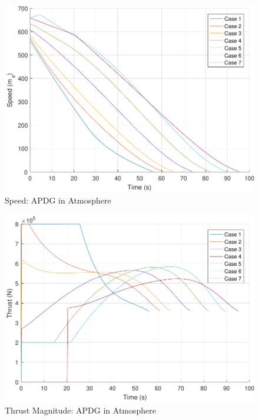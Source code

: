 \begin{figure}[H]
	\centering
	\begin{minipage}{4.5 in}
		\includegraphics[width=\linewidth]{Figures/spdpowatmo.pdf}
		\caption{Speed: APDG in Atmosphere \label{fig:spdpowatmo} }
	\end{minipage}
\end{figure}

\begin{figure}[H]
	\centering
	\begin{minipage}{4.5 in}
		\includegraphics[width=\linewidth]{Figures/thrpowatmo.pdf}
		\caption{Thrust Magnitude: APDG in Atmosphere \label{fig:thrpowatmo} }
	\end{minipage}
\end{figure}

